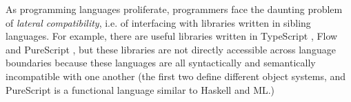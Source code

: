 \documentclass[preprint,10pt]{sigplanconf}
\begin{document}


%



As programming languages proliferate, programmers face the daunting problem of \emph{lateral compatibility}, i.e. of interfacing with libraries written in sibling languages. For example, there are useful libraries written in TypeScript \cite{bierman2014understanding}, Flow \cite{Flow} and PureScript \cite{PureScript}, but these libraries are not directly accessible across language boundaries because these languages are all syntactically and semantically incompatible with one another (the first two define different object systems, and PureScript is a functional language similar to Haskell and ML.) 
\end{document}
